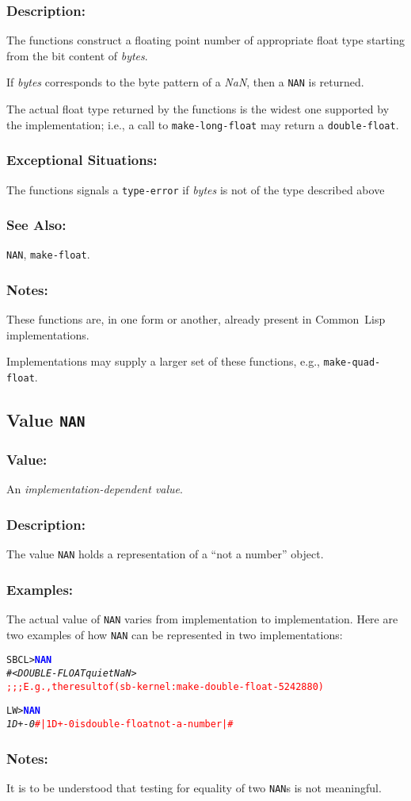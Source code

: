 \documentclass[10pt,fleqn]{article}
\newcommand{\CL}{\textsf{Common~Lisp}}
\newcommand{\code}[1]{\texttt{#1}}
\newcommand{\varname}[1]{\textit{#1}}
\newcommand{\codeprompt}[1]{\textcolor{blue}{\textbf{#1}}}
\newcommand{\DDictionaryItem}[1]{\vspace*{6pt}\noindent\hrulefill\vspace*{-9pt}\subsection*{#1}}
\newcommand{\DDescription}{\subsubsection*{Description:}}
\newcommand{\DExamples}{\subsubsection*{Examples:}}
\newcommand{\DExceptional}{\subsubsection*{Exceptional Situations:}}
\newcommand{\DNotes}{\subsubsection*{Notes:}}
\newcommand{\DSeeAlso}{\subsubsection*{See Also:}}
\begin{document}
\DDescription{}

The functions construct a floating point number of appropriate
float type starting from the bit content of
\varname{bytes}.

If \varname{bytes} corresponds to the byte pattern of a \emph{NaN},
then a \code{NAN} is returned.

The actual float type returned by the functions is the widest one
supported by the implementation; i.e., a call to
\code{make-long-float} may return a \code{double-float}.

\DExceptional{}

The functions signals a \code{type-error} if \varname{bytes} is not of
the type described above

\DSeeAlso{}

\code{NAN}, \code{make-float}.

\DNotes{}

These functions are, in one form or another, already present in \CL{}
implementations.

Implementations may supply a larger set of these functions, e.g.,
\code{make-quad-float}.


\DDictionaryItem{Value \code{NAN}}

\subsubsection*{Value:}

An \emph{implementation-dependent value}.


\DDescription{}

The value \code{NAN} holds a representation of a ``not a number'' object.


\DExamples{}

The actual value of \code{NAN} varies from implementation to
implementation.  Here are two examples of how \code{NAN} can be
represented in two implementations:

\begin{alltt}
SBCL> \codeprompt{NAN}
\textit{#<DOUBLE-FLOAT quiet NaN>}
\textcolor{red}{;;; E.g., the result of (sb-kernel:make-double-float -524288 0)}
\end{alltt}

\begin{alltt}
LW> \codeprompt{NAN}
\textit{1D+-0} \textcolor{red}{#| 1D+-0 is double-float not-a-number |#}
\end{alltt}

\DNotes{}

\noindent
It is to be understood that testing for equality of two \code{NAN}s is
not meaningful.
\end{document}
